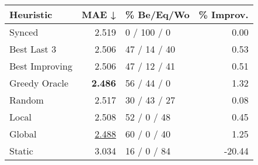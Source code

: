 \begin{tabular}{lrlr}
\toprule
\textbf{Heuristic} & \textbf{MAE ↓} & \textbf{\% Be/Eq/Wo} & \textbf{\% Improv.} \\
\midrule
            Synced &          2.519 &          0 / 100 / 0 &                0.00 \\
\midrule
       Best Last 3 &          2.506 &         47 / 14 / 40 &                0.53 \\
    Best Improving &          2.506 &         47 / 12 / 41 &                0.51 \\
\addlinespace
     Greedy Oracle &          \textbf{2.486} &          56 / 44 / 0 &                1.32 \\
            Random &          2.517 &         30 / 43 / 27 &                0.08 \\
\midrule
             Local &          2.508 &          52 / 0 / 48 &                0.45 \\
            Global &          \underline{2.488} &          60 / 0 / 40 &                1.25 \\
\midrule
            Static &          3.034 &          16 / 0 / 84 &              -20.44 \\
\bottomrule
\end{tabular}

\label{tab:hr_iid_lr01_le1_bs4_Summary}
